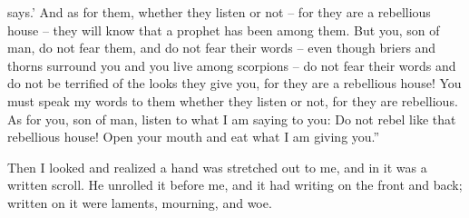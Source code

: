 {{}
says.’
And as for them,
whether
they listen
or
not
– for
they are
a rebellious
house –
they
will know
that
a prophet
has been
among them.
But you,
son
of man,
do not
fear
them,
and do not
fear
their words
– even though
briers
and thorns
surround you and you
live among scorpions – do not fear their words and do not be terrified of the looks they give you, for they are a rebellious house!
You must speak
my words
to
them whether
they listen
or
not,
for
they are
rebellious.
As for you,
son
of man,
listen
to what
I am
saying
to
you: Do
not
rebel
like that rebellious
house! Open
your mouth
and eat
what
I am
giving you.”
\par }{\PP {}Then I looked
and realized
a hand
was stretched out
to
me, and in it was a written scroll.
He unrolled
it before
me, and it had writing
on the front
and back;
written
on
it were laments,
mourning,
and woe.

}
